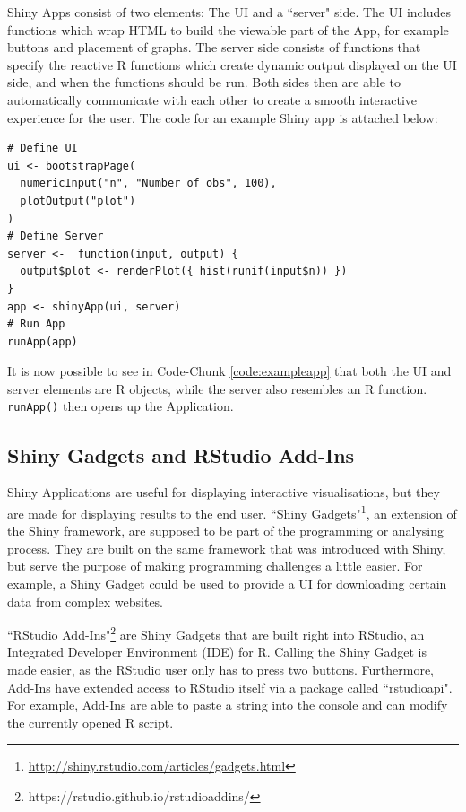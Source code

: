\documentclass[12pt]{article} %
\newcommand{\li}{\lstinline}
\begin{document}
Shiny Apps consist of two elements: The UI and a ``server" side. The UI includes functions which wrap HTML to build the viewable part of the App, for example buttons and placement of graphs. The server side consists of functions that specify the reactive R functions which create dynamic output displayed on the UI side, and when the functions should be run. Both sides then are able to automatically communicate with each other to create a smooth interactive experience for the user. The code for an example Shiny app is attached below:

\begin{lstlisting}[caption = Example code for a Shiny Application\cite{w2}., label = code:exampleapp]
# Define UI
ui <- bootstrapPage(
  numericInput("n", "Number of obs", 100),
  plotOutput("plot")
)
# Define Server
server <-  function(input, output) {
  output$plot <- renderPlot({ hist(runif(input$n)) })
}
app <- shinyApp(ui, server)
# Run App
runApp(app)
\end{lstlisting}

It is now possible to see in Code-Chunk \ref{code:exampleapp} that both the UI and server elements are R objects, while the server also resembles an R function. \li{runApp()} then opens up the Application.

\subsection{Shiny Gadgets and RStudio Add-Ins}

Shiny Applications are useful for displaying interactive visualisations, but they are made for displaying results to the end user. ``Shiny Gadgets"\footnote{\url{http://shiny.rstudio.com/articles/gadgets.html}}, an extension of the Shiny framework, are supposed to be part of the programming or analysing process. They are built on the same framework that was introduced with Shiny, but serve the purpose of making programming challenges a little easier. For example, a Shiny Gadget could be used to provide a UI for downloading certain data from complex websites. 

``RStudio Add-Ins"\footnote{https://rstudio.github.io/rstudioaddins/} are Shiny Gadgets that are built right into RStudio, an Integrated Developer Environment (IDE) for R. Calling the Shiny Gadget is made easier, as the RStudio user only has to press two buttons. Furthermore, Add-Ins have extended access to RStudio itself via a package called ``rstudioapi". For example, Add-Ins are able to paste a string into the console and can modify the currently opened R script.
\end{document}
